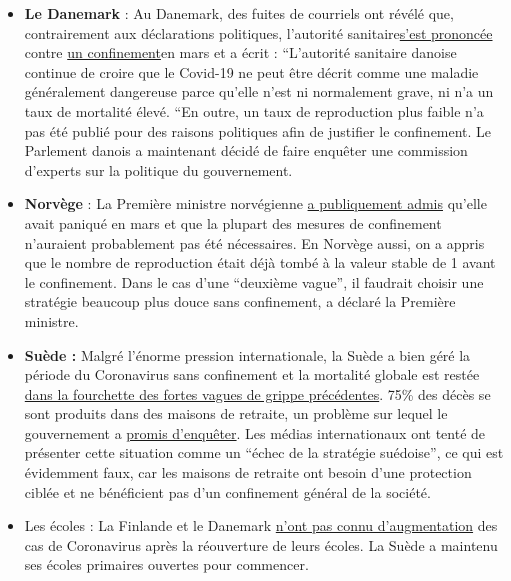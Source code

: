 \begin{itemize}
\tightlist
\item
  \textbf{Le Danemark} : Au Danemark, des fuites de courriels ont révélé
  que, contrairement aux déclarations politiques, l'autorité
  sanitaire\href{https://www.thelocal.dk/20200529/leaked-emails-show-how-denmarks-pm-steam-rollered-her-own-health-agency}{s'est
  prononcée} contre
  \href{https://www.thelocal.dk/20200529/leaked-emails-show-how-denmarks-pm-steam-rollered-her-own-health-agency}{un
  confinement}en mars et a écrit : ``L'autorité sanitaire danoise
  continue de croire que le Covid-19 ne peut être décrit comme une
  maladie généralement dangereuse parce qu'elle n'est ni normalement
  grave, ni n'a un taux de mortalité élevé. ``En outre, un taux de
  reproduction plus faible n'a pas été publié pour des raisons
  politiques afin de justifier le confinement. Le Parlement danois a
  maintenant décidé de faire enquêter une commission d'experts sur la
  politique du gouvernement.
\item
  \textbf{Norvège} : La Première ministre norvégienne
  \href{https://www.telegraph.co.uk/news/2020/05/30/coronavirus-norway-wonders-should-have-like-sweden/}{a
  publiquement admis} qu'elle avait paniqué en mars et que la plupart
  des mesures de confinement n'auraient probablement pas été
  nécessaires. En Norvège aussi, on a appris que le nombre de
  reproduction était déjà tombé à la valeur stable de 1 avant le
  confinement. Dans le cas d'une ``deuxième vague'', il faudrait choisir
  une stratégie beaucoup plus douce sans confinement, a déclaré la
  Première ministre.
\item
  \textbf{Suède :} Malgré l'énorme pression internationale, la Suède a
  bien géré la période du Coronavirus sans confinement et la mortalité
  globale est restée
  \href{https://www.reuters.com/article/us-health-coronavirus-sweden-toll/coronavirus-pushes-swedish-deaths-to-highest-since-1993-in-april-idUSKBN22U1S4}{dans
  la fourchette des fortes vagues de grippe précédentes}. 75\% des décès
  se sont produits dans des maisons de retraite, un problème sur lequel
  le gouvernement a
  \href{https://www.bloomberg.com/news/articles/2020-05-08/sweden-starts-criminal-probe-into-care-home-after-virus-deaths}{promis
  d'enquêter}. Les médias internationaux ont tenté de présenter cette
  situation comme un ``échec de la stratégie suédoise'', ce qui est
  évidemment faux, car les maisons de retraite ont besoin d'une
  protection ciblée et ne bénéficient pas d'un confinement général de la
  société.
\item
  Les écoles : La Finlande et le Danemark
  \href{https://www.telegraph.co.uk/news/2020/06/04/no-rise-finlands-coronavirus-infection-rate-since-schools-reopened/}{n'ont
  pas connu d'augmentation} des cas de Coronavirus après la réouverture
  de leurs écoles. La Suède a maintenu ses écoles primaires ouvertes
  pour commencer.
\end{itemize}

